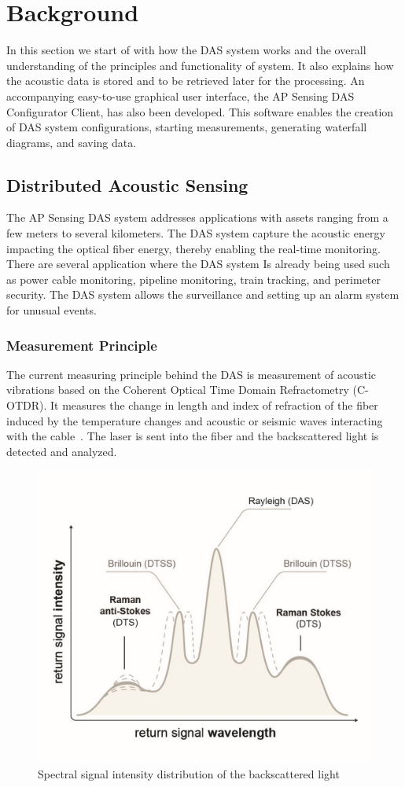 %
%
%
\chapter{Background}
In this section we start of with how the DAS system works and the overall understanding of the principles and functionality of system. It also explains how the acoustic data is stored and to be retrieved later for the processing. An accompanying easy-to-use graphical user interface, the AP Sensing DAS Configurator Client, has also been developed. This software enables the creation of DAS system configurations, starting measurements, generating waterfall diagrams, and saving data.  

\section{Distributed Acoustic Sensing}
The AP Sensing DAS system addresses applications with assets ranging from a few meters to several kilometers. The DAS system capture the acoustic energy impacting the optical fiber energy, thereby enabling the real-time monitoring. There are several application where the DAS system Is already being used such as power cable monitoring, pipeline monitoring, train tracking, and perimeter security. The DAS system allows the surveillance and setting up an alarm system for unusual events. 

\subsection{Measurement Principle}

The current measuring principle behind the DAS is measurement of acoustic vibrations based on the Coherent Optical Time Domain Refractometry (C-OTDR). It measures the change in length and index of refraction of the fiber induced by the temperature changes and acoustic or seismic waves interacting with the cable~\cite{duckworth}. The laser is sent into the fiber and the backscattered light is detected and analyzed. 

\begin{figure}[h]
    \centering
    \includegraphics[width=0.7\linewidth]{Bilder/jpg/COTDR.jpg}
    \caption{Spectral signal intensity distribution of the backscattered light~\cite{DAS_Manual}}
    \label{COTDR}
\end{figure}
 
